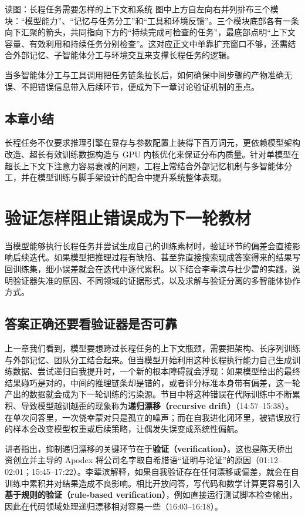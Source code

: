 \documentclass[UTF8,a4paper,11pt,fontset=fandol]{ctexart}
\begin{document}
\begin{knowledgebox}{读图：长程任务需要怎样的上下文和系统}
图中上方自左向右并列排布三个模块：“模型能力”、“记忆与任务分工”和“工具和环境反馈”。三个模块底部各有一条向下汇聚的箭头，共同指向下方的“持续完成可检查的任务”，最底部点明“上下文容量、有效利用和持续任务分别检查”。这对应正文中单靠扩充窗口不够，还需结合外部记忆、子智能体分工与环境交互来支撑长程任务的逻辑。
\end{knowledgebox}
当多智能体分工与工具调用把任务链条拉长后，如何确保中间步骤的产物准确无误、不把错误信息带入后续环节，便成为下一章讨论验证机制的重点。
\subsection{本章小结}
长程任务不仅要求推理引擎在显存与参数配置上装得下百万词元，更依赖模型架构改造、超长有效训练数据构造与 GPU 内核优化来保证分布内质量。针对单模型在超长上下文下注意力容易衰减的问题，工程上常结合外部记忆机制与多智能体分工，并在模型训练与脚手架设计的配合中提升系统整体表现。
\section{验证怎样阻止错误成为下一轮教材}
当模型能够执行长程任务并尝试生成自己的训练素材时，验证环节的偏差会直接影响后续迭代。如果模型把推理过程有缺陷、甚至靠直接搜索现成答案得来的结果写回训练集，细小误差就会在迭代中逐代累积。以下结合李辈滨与杜少雷的实践，说明验证器失准的原因、不同领域的证据形式，以及求解与验证分离的多智能体协作方式。
\subsection{答案正确还要看验证器是否可靠}
上一章我们看到，模型要想跨过长程任务的上下文瓶颈，需要把架构、长序列训练与外部记忆、团队分工结合起来。但当模型开始利用这种长程执行能力自己生成训练数据、尝试递归自我提升时，一个新的根本障碍就会浮现：如果模型给出的最终结果碰巧是对的，中间的推理链条却是错的，或者评分标准本身带有偏差，这一轮产出的数据就会成为下一轮训练的污染源。节目中将这种错误在代际训练中不断累积、导致模型越训越歪的现象称为\textbf{递归漂移（recursive drift）}（14:57–15:38）。在单次问答里，一次侥幸蒙对只是孤立的噪声；而在自我进化闭环里，被错误放行的样本会改变模型权重或后续策略，让偶发失误变成系统性偏航。

讲者指出，抑制递归漂移的关键环节在于\textbf{验证（verification）}。这也是陈天桥出资创立并主导的 Apodex 将公司名字取自希腊语“证明与论证”的原因（01:12–02:01；15:45–17:22）。李辈滨解释，如果自我验证存在任何漂移或偏差，就会在自训练中累积并对结果造成不良影响。相比开放问答，写代码和数学计算更容易引入\textbf{基于规则的验证（rule-based verification）}，例如直接运行测试脚本检查输出，因此在代码领域处理递归漂移相对容易一些（16:03–16:18）。
\end{document}

